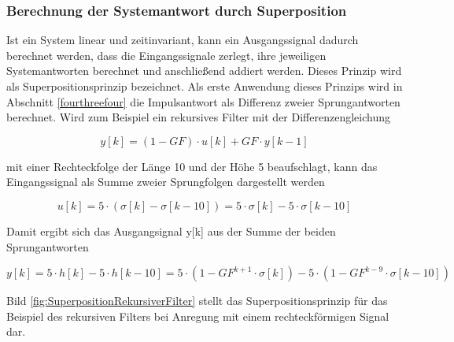 \subsubsection{Berechnung der Systemantwort durch Superposition}

\noindent Ist ein System linear und zeitinvariant, kann ein Ausgangssignal dadurch berechnet werden, dass die Eingangssignale zerlegt, ihre jeweiligen Systemantworten berechnet und anschlie{\ss}end addiert werden. Dieses Prinzip wird als Superpositionsprinzip bezeichnet. Als erste Anwendung dieses Prinzips wird in Abschnitt \ref{fourthreefour} die Impulsantwort als Differenz zweier Sprungantworten berechnet. Wird zum Beispiel ein rekursives Filter mit der Differenzengleichung 

\begin{equation}\label{eq:foureightytwo}
y\left[k\right]=\left(1-GF\right)\cdot u\left[k\right]+GF\cdot y\left[k-1\right]
\end{equation}

\noindent mit einer Rechteckfolge der L\"{a}nge 10 und der H\"{o}he 5 beaufschlagt, kann das Eingangssignal als Summe zweier Sprungfolgen dargestellt werden

\begin{equation}\label{eq:foureightythree}
u\left[k\right]=5\cdot \left(\sigma \left[k\right]-\sigma \left[k-10\right]\right)=5\cdot \sigma \left[k\right]-5\cdot \sigma \left[k-10\right]
\end{equation}

\noindent Damit ergibt sich das Ausgangsignal y[k] aus der Summe der beiden Sprungantworten

\begin{equation}\label{eq:foureightyfour}
y\left[k\right]=5\cdot h\left[k\right]-5\cdot h\left[k-10\right]=5\cdot \left(1-GF^{k+1} \cdot \sigma \left[k\right]\right)-5\cdot \left(1-GF^{k-9} \cdot \sigma \left[k-10\right]\right)
\end{equation}

\noindent Bild \ref{fig:SuperpositionRekursiverFilter} stellt das Superpositionsprinzip f\"{u}r das Beispiel des rekursiven Filters bei Anregung mit einem rechteckf\"{o}rmigen Signal dar.

